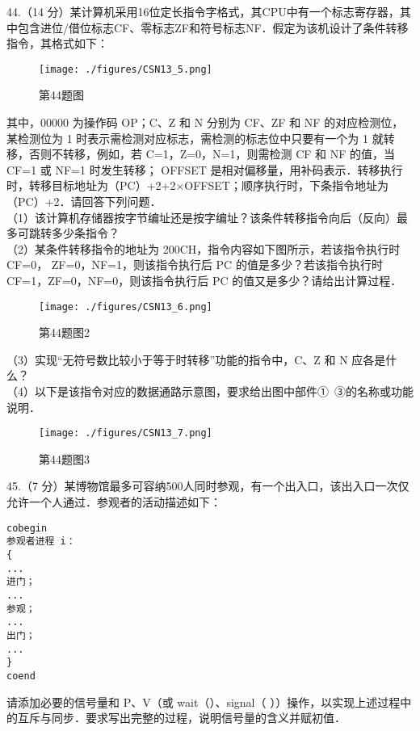 44.（14 分）某计算机采用16位定长指令字格式，其CPU中有一个标志寄存器，其中包含进位/借位标志CF、零标志ZF和符号标志NF．假定为该机设计了条件转移指令，其格式如下：
\begin{figure}[ht]
\centering
\texttt{[image: ./figures/CSN13\_5.png]}
\caption{第44题图} \label{CSN13_fig5}
\end{figure}
 其中，00000 为操作码 OP；C、Z 和 N 分别为 CF、ZF 和 NF 的对应检测位，某检测位为 1 时表示需检测对应标志，需检测的标志位中只要有一个为 1 就转移，否则不转移，例如，若 C=1，Z=0，N=1，则需检测 CF 和 NF 的值，当 CF=1 或 NF=1 时发生转移； OFFSET 是相对偏移量，用补码表示．转移执行时，转移目标地址为（PC）+2+2×OFFSET；顺序执行时，下条指令地址为（PC）+2．请回答下列问题．  \\
（1）该计算机存储器按字节编址还是按字编址？该条件转移指令向后（反向）最多可跳转多少条指令？ \\
（2）某条件转移指令的地址为 200CH，指令内容如下图所示，若该指令执行时 CF=0， ZF=0，NF=1，则该指令执行后 PC 的值是多少？若该指令执行时 CF=1，ZF=0，NF=0，则该指令执行后 PC 的值又是多少？请给出计算过程． \\
\begin{figure}[ht]
\centering
\texttt{[image: ./figures/CSN13\_6.png]}
\caption{第44题图2} \label{CSN13_fig6}
\end{figure}
（3）实现“无符号数比较小于等于时转移”功能的指令中，C、Z 和 N 应各是什么？  \\
（4）以下是该指令对应的数据通路示意图，要求给出图中部件①~③的名称或功能说明．  \\
\begin{figure}[ht]
\centering
\texttt{[image: ./figures/CSN13\_7.png]}
\caption{第44题图3} \label{CSN13_fig7}
\end{figure}

45.（7 分）某博物馆最多可容纳500人同时参观，有一个出入口，该出入口一次仅允许一个人通过．参观者的活动描述如下：    
\begin{lstlisting}
cobegin 
参观者进程 i： 
{ 
...
进门；
...
参观；
...
出门；
...
}
coend 
\end{lstlisting}
请添加必要的信号量和 P、V（或 wait（）、signal（ ））操作，以实现上述过程中的互斥与同步．要求写出完整的过程，说明信号量的含义并赋初值．

